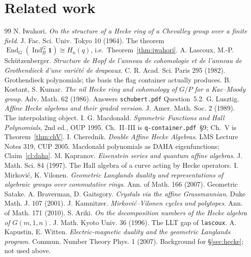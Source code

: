 \documentclass[11pt,a4paper]{article}
\theoremstyle{definition}
\theoremstyle{remark}
\DeclareMathOperator{\End}{End}
\DeclareMathOperator{\Ind}{Ind}
\begin{document}
\section{Related work}

\begin{thebibliography}{99}\small
{} N. Iwahori. \emph{On the structure of a Hecke ring of a
Chevalley group over a finite field}. J. Fac. Sci. Univ. Tokyo 10 (1964).
The theorem $\End_G(\Ind_B^G \mathbf{1}) \cong H_n(q)$, i.e.\
Theorem~\ref{thm:iwahori}.
 A. Lascoux, M.-P. Sch\"utzenberger. \emph{Structure de Hopf de
l'anneau de cohomologie et de l'anneau de Grothendieck d'une vari\'et\'e de
drapeaux}. C. R. Acad. Sci. Paris 295 (1982). Grothendieck polynomials; the
basis the flag container actually produces.
 B. Kostant, S. Kumar. \emph{The nil Hecke ring and cohomology of
$G/P$ for a Kac--Moody group}. Adv. Math. 62 (1986). Answers
\texttt{schubert.pdf} Question~5.2.
 G. Lusztig. \emph{Affine Hecke algebras and their graded
version}. J. Amer. Math. Soc. 2 (1989). The interpolating object.
\bibitem{Macdonald} I. G. Macdonald. \emph{Symmetric Functions and Hall
Polynomials}, 2nd ed., OUP 1995. Ch.~II--III is \texttt{q-container.pdf}~\S9;
Ch.~V is Theorem~\ref{thm:chV}.
 I. Cherednik. \emph{Double Affine Hecke Algebras}. LMS
Lecture Notes 319, CUP 2005. Macdonald polynomials as DAHA eigenfunctions;
Claim~\ref{cl:daha}.
 M. Kapranov. \emph{Eisenstein series and quantum affine
algebras}. J. Math. Sci. 84 (1997). The Hall algebra of a curve acting by
Hecke operators.
 I. Mirkovi\'c, K. Vilonen. \emph{Geometric Langlands duality and
representations of algebraic groups over commutative rings}. Ann. of Math. 166
(2007). Geometric Satake.
 A. Braverman, D. Gaitsgory. \emph{Crystals via the affine
Grassmannian}. Duke Math. J. 107 (2001).
 J. Kamnitzer. \emph{Mirkovi\'c--Vilonen cycles and
polytopes}. Ann. of Math. 171 (2010).
 S. Ariki. \emph{On the decomposition numbers of the Hecke
algebra of $G(m,1,n)$}. J. Math. Kyoto Univ. 36 (1996). The LLT gap of
\texttt{lascoux}.
 A. Kapustin, E. Witten. \emph{Electric-magnetic duality and the
geometric Langlands program}. Commun. Number Theory Phys. 1 (2007). Background
for \S\ref{sec:hecke}; not used above.
\end{thebibliography}
\end{document}
